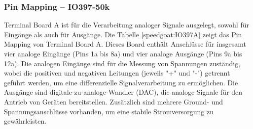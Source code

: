\pagebreak[4]

\subsubsection{Pin Mapping – IO397-50k}

Terminal Board A ist für die Verarbeitung analoger Signale ausgelegt, sowohl für Eingänge als auch für Ausgänge. Die Tabelle \ref{speedgoat:IO397A} zeigt das Pin Mapping von Terminal Board A. Dieses Board enthält Anschlüsse für insgesamt vier analoge Eingänge (Pins 1a bis 8a) und vier analoge Ausgänge (Pins 9a bis 12a). Die analogen Eingänge sind für die Messung von Spannungen zuständig, wobei die positiven und negativen Leitungen (jeweils "+" und "-") getrennt geführt werden, um eine differenzielle Signalverarbeitung zu ermöglichen. Die Ausgänge sind digitale-zu-analoge-Wandler (DAC), die analoge Signale für den Antrieb von Geräten bereitstellen. Zusätzlich sind mehrere Ground- und Spannungsanschlüsse vorhanden, um eine stabile Stromversorgung zu gewährleisten.
